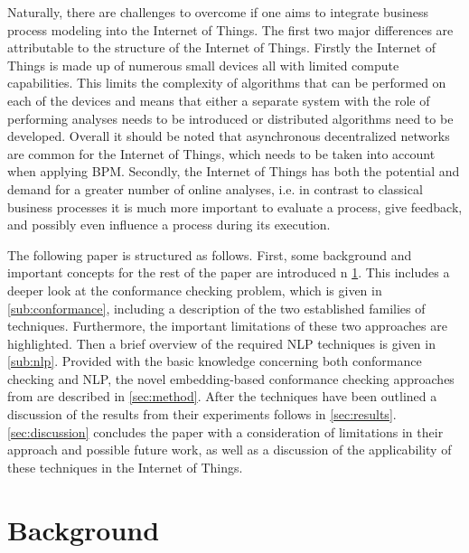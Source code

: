 \documentclass[runningheads]{template/llncs}
\begin{document}
Naturally, there are challenges to overcome if one aims to integrate business process modeling into the Internet of Things.
The first two major differences are attributable to the structure of the Internet of Things.
Firstly the Internet of Things is made up of numerous small devices all with limited compute capabilities.
This limits the complexity of algorithms that can be performed on each of the devices and means that either a separate system with the role of performing analyses needs to be introduced or distributed algorithms need to be developed.
Overall it should be noted that asynchronous decentralized networks are common for the Internet of Things, which needs to be taken into account when applying BPM.
Secondly, the Internet of Things has both the potential and demand for a greater number of online analyses, i.e. in contrast to classical business processes it is much more important to evaluate a process, give feedback, and possibly even influence a process during its execution.


The following paper is structured as follows.
First, some background and important concepts for the rest of the paper are introduced n \cref{sec:background}.
This includes a deeper look at the conformance checking problem, which is given in \cref{sub:conformance}, including a description of the two established families of techniques.
Furthermore, the important limitations of these two approaches are highlighted.
Then a brief overview of the required NLP techniques is given in \cref{sub:nlp}.
Provided with the basic knowledge concerning both conformance checking and NLP, the novel embedding-based conformance checking approaches from \cite{PBWe20} are described in \cref{sec:method}.
After the techniques have been outlined a discussion of the results from their experiments follows in \cref{sec:results}.
\cref{sec:discussion} concludes the paper with a consideration of limitations in their approach and possible future work, as well as a discussion of the applicability of these techniques in the Internet of Things.


\section{Background}
\label{sec:background}
\end{document}
